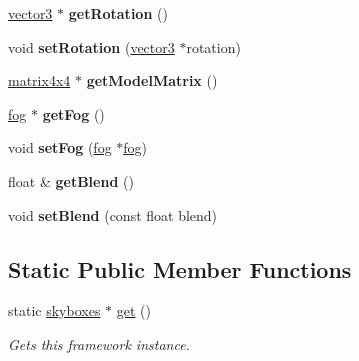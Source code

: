 \begin{DoxyCompactItemize}
\item 
\mbox{\label{classflounder_1_1skyboxes_ae76042e8652f74e970dee8c12e77a502}} 
\hyperlink{classflounder_1_1vector3}{vector3} $\ast$ {\bfseries get\+Rotation} ()
\item 
\mbox{\label{classflounder_1_1skyboxes_ab6bf41c31faab39f9f26e770d8a73ef1}} 
void {\bfseries set\+Rotation} (\hyperlink{classflounder_1_1vector3}{vector3} $\ast$rotation)
\item 
\mbox{\label{classflounder_1_1skyboxes_a3dba8a6d2312137aed273a59bd800f26}} 
\hyperlink{classflounder_1_1matrix4x4}{matrix4x4} $\ast$ {\bfseries get\+Model\+Matrix} ()
\item 
\mbox{\label{classflounder_1_1skyboxes_a7792767f3e4ba57d15c8ef4849e67f1b}} 
\hyperlink{classflounder_1_1fog}{fog} $\ast$ {\bfseries get\+Fog} ()
\item 
\mbox{\label{classflounder_1_1skyboxes_a63e345f07ea2429202b0978401610c15}} 
void {\bfseries set\+Fog} (\hyperlink{classflounder_1_1fog}{fog} $\ast$\hyperlink{classflounder_1_1fog}{fog})
\item 
\mbox{\label{classflounder_1_1skyboxes_a53ca1ae5992264a2c7c0a1c707fa53c5}} 
float \& {\bfseries get\+Blend} ()
\item 
\mbox{\label{classflounder_1_1skyboxes_ab28cf9f93424755e4d59f79ebe913728}} 
void {\bfseries set\+Blend} (const float blend)
\end{DoxyCompactItemize}
\subsection*{Static Public Member Functions}
\begin{DoxyCompactItemize}
\item 
static \hyperlink{classflounder_1_1skyboxes}{skyboxes} $\ast$ \hyperlink{classflounder_1_1skyboxes_a07d7f073ed0899414f7f4e1f719e6406}{get} ()
\begin{DoxyCompactList}\small\item\em Gets this framework instance. \end{DoxyCompactList}\end{DoxyCompactItemize}
